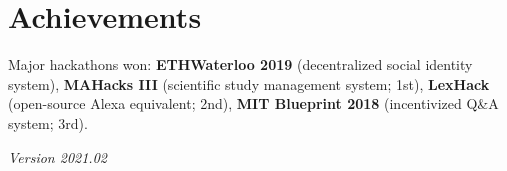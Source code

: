 \documentclass[letterpaper,11pt]{article}
\begin{document}
\section{Achievements}

Major hackathons won: \textbf{ETHWaterloo 2019} (decentralized social identity
system), \textbf{MAHacks III} (scientific study management system; 1st), \textbf{LexHack}
(open-source Alexa equivalent; 2nd), \textbf{MIT Blueprint 2018} (incentivized
Q\&A system; 3rd).

\begin{flushright}
     \textit{Version 2021.02}
\end{flushright}
\end{document}
